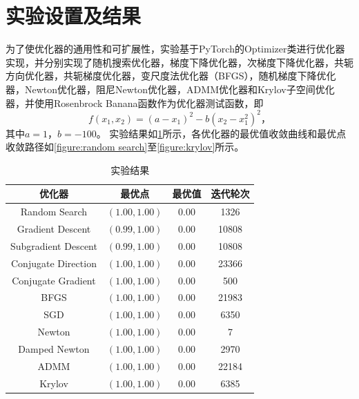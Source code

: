 \section{实验设置及结果}

为了使优化器的通用性和可扩展性，实验基于PyTorch的Optimizer类进行优化器实现，并分别实现了随机搜索优化器，梯度下降优化器，次梯度下降优化器，共轭方向优化器，共轭梯度优化器，变尺度法优化器（BFGS），随机梯度下降优化器，Newton优化器，阻尼Newton优化器，ADMM优化器和Krylov子空间优化器，并使用Rosenbrock Banana函数作为优化器测试函数，即
\begin{equation*}
    f(x_1, x_2)=(a-x_1)^2-b(x_2-x_1^2)^2 \text{，}
\end{equation*}
其中$a=1$，$b=-100$。
实验结果如\cref{table:result}所示，各优化器的最优值收敛曲线和最优点收敛路径如\cref{figure:random search}至\cref{figure:krylov}所示。

\begin{table}[ht]
    \centering
    \caption{实验结果}
    \label{table:result}
    \begin{tabular}{cccc}
        \toprule
        \textbf{优化器} & \textbf{最优点} & \textbf{最优值} & \textbf{迭代轮次} \\
        \midrule
        Random Search & $(1.00, 1.00)$ & 0.00 & 1326 \\
        Gradient Descent & $(0.99, 1.00)$ & 0.00 & 10808 \\
        Subgradient Descent & $(0.99, 1.00)$ & 0.00 & 10808 \\
        Conjugate Direction & $(1.00, 1.00)$ & 0.00 & 23366 \\
        Conjugate Gradient & $(1.00, 1.00)$ & 0.00 & 500 \\
        BFGS & $(1.00, 1.00)$ & 0.00 & 21983 \\
        SGD & $(1.00, 1.00)$ & 0.00 & 6350 \\
        Newton & $(1.00, 1.00)$ & 0.00 & 7 \\
        Damped Newton & $(1.00, 1.00)$ & 0.00 & 2970 \\
        ADMM & $(1.00, 1.00)$ & 0.00 & 22184 \\
        Krylov & $(1.00, 1.00)$ & 0.00 & 6385 \\
        \bottomrule
    \end{tabular}
\end{table}


